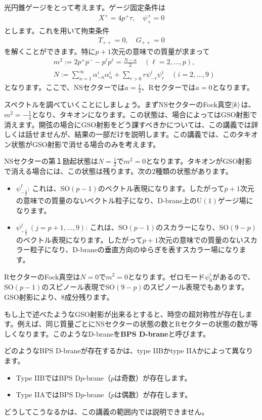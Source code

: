 \documentclass[report,paper=a4, fontsize=12pt, line_length=16cm, number_of_lines=34,dvipdfmx]{jlreq}
\numberwithin{equation}{chapter}
\numberwithin{equation}{section}
\newcommand{\kyou}[1]{{\sffamily \bfseries #1}}
\begin{document}
光円錐ゲージをとって考えます。ゲージ固定条件は
\begin{align}
  X^{+}=4p^{+}\tau,\quad \psi_{+}^{+}=0
\end{align}
とします。これを用いて拘束条件
\begin{align}
  T_{++}=0,\quad G_{++}=0
\end{align}
を解くことができます。特に$p+1$次元の意味での質量が求まって
\begin{align}
  &m^2:=2p^{+}p^{-}-p^{\ell}p^{\ell}=\frac{N-a}{2}\quad (\ell=2,\dots,p),\\ 
  &N:=\sum_{n=1}^{\infty}\alpha_{-n}^{i}\alpha_{n}^{i}+\sum_{r>0}r\psi_{-r}^{i}\psi_{r}^{i}\quad (i=2,\dots,9)
\end{align}
となります。ここで、NSセクターでは$a=\frac12$、Rセクターでは$a=0$となります。

スペクトルを調べていくことにしましょう。まずNSセクターのFock真空$\ket{k}$は、$m^2=-\frac14$となり、タキオンになります。この状態は、場合によってはGSO射影で消えます。開弦の場合にGSO射影をどう課すべきかについては、この講義では詳しくは話せませんが、結果の一部だけを説明します。この講義では、このタキオン状態がGSO射影で消せる場合のみを考えます。

NSセクターの第１励起状態は$N=\frac12$で$m^2=0$となります。タキオンがGSO射影で消える場合には、この状態は残ります。次の2種類の状態があります。
\begin{itemize}
  \item $\psi_{-\frac12}^{\ell}$: これは、SO$(p-1)$のベクトル表現になります。したがって$p+1$次元の意味での質量のないベクトル粒子になり、D-brane上のU$(1)$ゲージ場になります。
  \item $\psi_{-\frac12}^{j}\ (j=p+1,\dots,9)$: これは、SO$(p-1)$のスカラーになり、SO$(9-p)$のベクトル表現になります。したがって$p+1$次元の意味での質量のないスカラー粒子になり、D-braneの垂直方向のゆらぎを表すスカラー場になります。
\end{itemize}

RセクターのFock真空は$N=0$で$m^2=0$となります。ゼロモード$\psi^{i}_{0}$があるので、SO$(p-1)$のスピノール表現でSO$(9-p)$のスピノール表現でもあります。GSO射影により、8成分残ります。

もし上で述べたようなGSO射影が出来るとすると、時空の超対称性が存在します。例えば、同じ質量ごとにNSセクターの状態の数とRセクターの状態の数が等しくなります。このようなD-braneを\kyou{BPS D-brane}と呼びます。

どのようなBPS D-braneが存在するかは、type IIBかtype IIAかによって異なります。
\begin{itemize}
  \item Type IIBではBPS D$p$-brane（$p$は奇数）が存在します。
  \item Type IIAではBPS D$p$-brane（$p$は偶数）が存在します。
\end{itemize}
どうしてこうなるかは、この講義の範囲内では説明できません。
\end{document}
